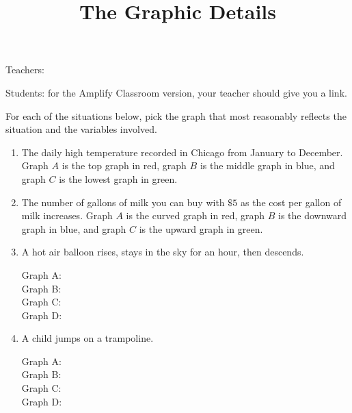 \documentclass[nooutcomes,noauthor,handout]{ximera}
\title{The Graphic Details}
\begin{document}
\begin{abstract}\end{abstract}
\maketitle

Teachers: 

Students: for the Amplify Classroom version, your teacher should give you a link.




\begin{problem}
For each of the situations below, pick the graph that most reasonably
reflects the situation and the variables involved.

\begin{enumerate}
\item The daily high temperature recorded in Chicago from January to
  December. Graph $A$ is the top graph in red, graph $B$ is the middle graph 
  in blue, and graph $C$ is the lowest graph in green.

\begin{center}
\end{center}

\item The number of gallons of milk you can buy with $\$5$ as the cost per gallon of
  milk increases. Graph $A$ is the curved graph in red, graph $B$ is the downward graph 
  in blue, and graph $C$ is the upward graph in green.

\begin{center}
\end{center}


\item A hot air balloon rises, stays in the sky for an hour, then descends.

Graph A:  \\
Graph B:  \\
Graph C:  \\
Graph D:  \\


\item A child jumps on a trampoline.

Graph A:  \\
Graph B:  \\
Graph C:  \\
Graph D:  \\



\end{enumerate}
\end{problem}
\end{document}
